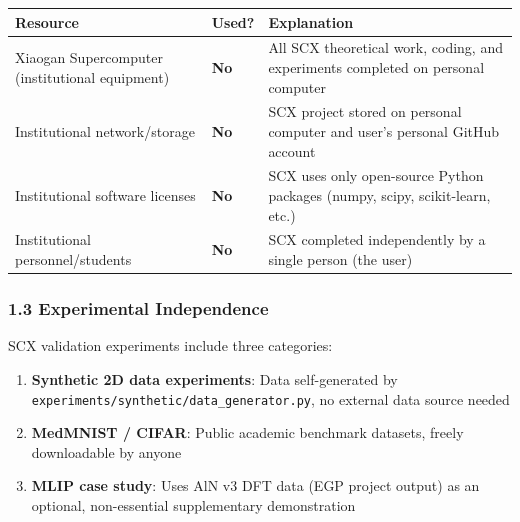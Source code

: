 \documentclass[
  12pt,
]{article}
\providecommand{\tightlist}{%
  \setlength{\itemsep}{0pt}\setlength{\parskip}{0pt}}
\begin{document}
\begin{longtable}[]{@{}
  >{\raggedright\arraybackslash}p{}
  >{\raggedright\arraybackslash}p{}
  >{\raggedright\arraybackslash}p{}@{}}
\toprule\noalign{}
\begin{minipage}[b]{\linewidth}\raggedright
Resource
\end{minipage} & \begin{minipage}[b]{\linewidth}\raggedright
Used?
\end{minipage} & \begin{minipage}[b]{\linewidth}\raggedright
Explanation
\end{minipage} \\
\midrule\noalign{}
\endhead
\bottomrule\noalign{}
\endlastfoot
Xiaogan Supercomputer (institutional equipment) & \textbf{No} & All SCX theoretical work, coding, and experiments completed on personal computer \\
Institutional network/storage & \textbf{No} & SCX project stored on personal computer and user's personal GitHub account \\
Institutional software licenses & \textbf{No} & SCX uses only open-source Python packages (numpy, scipy, scikit-learn, etc.) \\
Institutional personnel/students & \textbf{No} & SCX completed independently by a single person (the user) \\
\end{longtable}

\subsubsection{1.3 Experimental Independence}\label{experimental-independence}

SCX validation experiments include three categories:

\begin{enumerate}
\def\labelenumi{\arabic{enumi}.}
\tightlist
\item
  \textbf{Synthetic 2D data experiments}: Data self-generated by \texttt{experiments/synthetic/data\_generator.py}, no external data source needed
\item
  \textbf{MedMNIST / CIFAR}: Public academic benchmark datasets, freely downloadable by anyone
\item
  \textbf{MLIP case study}: Uses AlN v3 DFT data (EGP project output) as an optional, non-essential supplementary demonstration
\end{enumerate}
\end{document}
